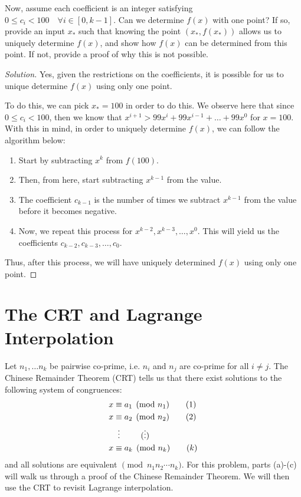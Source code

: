 \documentclass{article}
\newenvironment{solution}{\begin{proof}[Solution]}{\end{proof}}
\begin{document}
\begin{hw}
	Now, assume each coefficient is an integer satisfying $0 \leq c_i < 100 \quad \forall{i \in [0, k-1]}$. Can we determine $f(x)$ with one point? If so, provide an input $x_*$ such that knowing the point $(x_*, f(x_*))$ allows us to uniquely determine $f(x)$, and show how $f(x)$ can be determined from this point. If not, provide a proof of why this is not possible.
\end{hw}
\begin{solution}
	Yes, given the restrictions on the coefficients, it is possible for us to unique determine $f(x)$ using only one point.
	
	To do this, we can pick $x_{*} = 100$ in order to do this. We observe here that since $0 \leq c_{i} < 100$, then we know that $x^{i+1} > 99x^{i} + 99x^{i-1} + \ldots + 99x^{0}$ for $x = 100$. With this in mind, in order to uniquely determine $f(x)$, we can follow the algorithm below:
	\begin{enumerate}
		\item Start by subtracting $x^{k}$ from $f(100)$.
		\item Then, from here, start subtracting $x^{k-1}$ from the value.
		\item The coefficient $c_{k-1}$ is the number of times we subtract $x^{k-1}$ from the value before it becomes negative.
		\item Now, we repeat this process for $x^{k-2}, x^{k-3}, \ldots, x^{0}$. This will yield us the coefficients $c_{k-2}, c_{k-3}, \ldots, c_{0}$. 
	\end{enumerate} 

	Thus, after this process, we will have uniquely determined $f(x)$ using only one point.
\end{solution}

\newpage

\section{The CRT and Lagrange Interpolation}
Let $n_1, \ldots n_k$ be pairwise co-prime, i.e. $n_i$ and $n_j$ are co-prime for all $i \neq j$. The Chinese Remainder Theorem (CRT) tells us that there exist solutions to the following system of congruences:
\begin{align}
	x &\equiv a_1 \pmod{n_1} \tag{1} \\
	x &\equiv a_2 \pmod{n_2} \tag{2} \\
	&\vdotswithin{\equiv} \tag{$\vdots$} \\
	x &\equiv a_k \pmod{n_k} \tag{$k$}
\end{align}
and all solutions are equivalent $\pmod{n_1 n_2 \cdots n_k}$. For this problem, parts (a)-(c) will walk us through a proof of the Chinese Remainder Theorem.
We will then use the CRT to revisit Lagrange interpolation.
\end{document}
